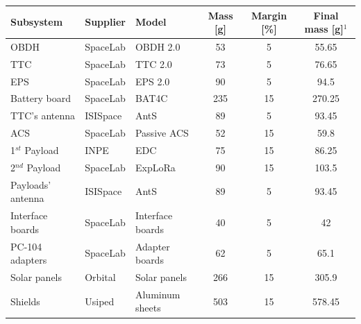
\begin{table}[!ht]
    \centering
    \footnotesize
    \begin{tabular}{lllccc}
        \toprule[1.5pt]
        \textbf{Subsystem} & \textbf{Supplier} & \textbf{Model} & \textbf{Mass [g]} & \textbf{Margin [\%]} & \textbf{Final mass [g]$^{1}$}\\
        \midrule
        \ac{OBDH}          & SpaceLab  & \ac{OBDH} 2.0     & 53  & 5  & 55.65 \\
        \ac{TTC}           & SpaceLab  & \ac{TTC} 2.0      & 73  & 5  & 76.65 \\
        \ac{EPS}           & SpaceLab  & \ac{EPS} 2.0      & 90  & 5  & 94.5 \\
        Battery board      & SpaceLab  & \acs{BAT4C}       & 235 & 15 & 270.25 \\
        \ac{TTC}’s antenna & ISISpace  & AntS              & 89  & 5  & 93.45 \\
        \acs{ACS}          & SpaceLab  & Passive \acs{ACS} & 52  & 15 & 59.8 \\
        1$^{st}$ Payload   & \ac{INPE} & \ac{EDC}          & 75  & 15 & 86.25 \\
        2$^{nd}$ Payload   & SpaceLab  & ExpLoRa           & 90  & 15 & 103.5 \\
        Payloads’ antenna  & ISISpace  & AntS              & 89  & 5  & 93.45 \\
        Interface boards   & SpaceLab  & Interface boards  & 40  & 5  & 42 \\
        PC-104 adapters    & SpaceLab  & Adapter boards    & 62  & 5  & 65.1 \\
        Solar panels       & Orbital   & Solar panels      & 266 & 15 & 305.9 \\
        Shields            & Usiped    & Aluminum sheets   & 503 & 15 & 578.45 \\

\end{tabular}
\end{table}
